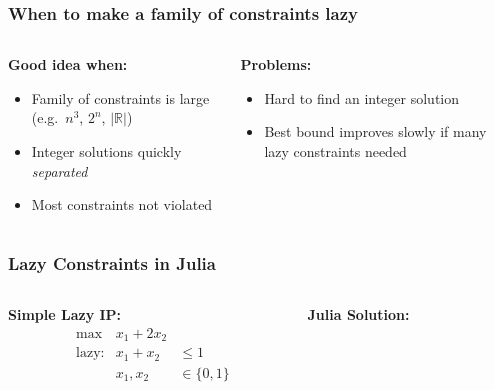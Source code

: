 \documentclass{beamer}
\begin{document}
\begin{frame}
    \frametitle{When to make a family of constraints lazy}
  \begin{columns}
    \begin{column}[t]{.5\linewidth}
      {\bf Good idea when:}
      \begin{itemize}
      \item Family of constraints is large (e.g.\ $n^3$, $2^n$, $|\mathbb R|$)
      \item Integer solutions quickly \emph{separated}
      \item Most constraints not violated
      \end{itemize}
    \end{column}\pause
    \begin{column}[t]{.5\linewidth}
      {\bf Problems:}
      \begin{itemize}
      \item Hard to find an integer solution
      \item Best bound improves slowly if many lazy constraints needed
      \end{itemize}
    \end{column}
  \end{columns}
  

\end{frame}

\begin{frame}
  \frametitle{Lazy Constraints in Julia}
  \begin{columns}
    \begin{column}[t]{.3\linewidth}
      {\bf Simple Lazy IP:}
      \begin{align*}
        &\max&x_1 + 2 x_2\\
        &\text{lazy:}& x_1 + x_2 &\leq 1\\
        &&x_1,x_2&\in \{0,1\}
      \end{align*}
    \end{column}
    \begin{column}[t]{.7\linewidth}
      {\bf Julia Solution:}
      \pause
      \begin{footnotesize}
              
      \end{footnotesize}
    \end{column}
  \end{columns}

\end{frame}
\end{document}
